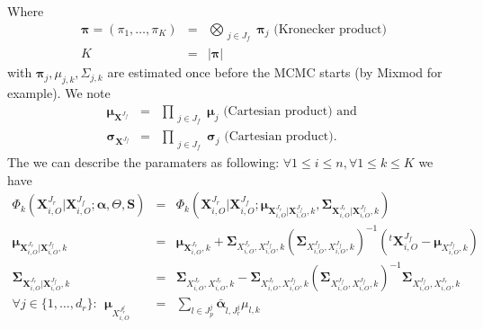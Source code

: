 \documentclass[12pt,a4paper]{report}
\begin{document}
Where	
\begin{eqnarray}
	\boldsymbol{\pi}=(\pi_1,\dots,\pi_K)&=&\bigotimes_{\substack{j \in J_f }} \boldsymbol{\pi}_j \textrm{ (Kronecker product)}\\
	K&=& |\boldsymbol{\pi}|%
\end{eqnarray}
		with $ \boldsymbol{\pi}_j, \mu_{j,k},\Sigma_{j,k}$ are estimated once before the MCMC starts (by Mixmod for example).
		We note 
		\begin{eqnarray}
		\boldsymbol{\mu}_{\boldsymbol{X}^{J_f}}&=&  \prod_{\substack{j \in J_f}}\boldsymbol{\mu}_{j} \textrm{ (Cartesian product) and } \\	
	\boldsymbol{\sigma}_{\boldsymbol{X}^{J_f}}&=&\prod_{\substack{j \in J_f}}\boldsymbol{\sigma}_{j} \textrm{ (Cartesian product). }
		\end{eqnarray}
		The we can describe the paramaters as following:
		$\forall 1\leq i \leq n, \forall 1\leq k \leq K$ we have
\begin{eqnarray}
		\Phi_k(\boldsymbol{X}^{J_r}_{i,O}|\boldsymbol{X}^{J_f}_{i,O};\boldsymbol{\alpha},\Theta,\boldsymbol{S})&=&\Phi_k(\boldsymbol{X}^{J_r}_{i,O}|\boldsymbol{X}^{J_f}_{i,O};\boldsymbol{\mu}_{\boldsymbol{X}^{J_r}_{i,O}|\boldsymbol{X}^{J_f}_{i,O},k},\boldsymbol{\Sigma}_{\boldsymbol{X}^{J_r}_{i,O}|\boldsymbol{X}^{J_f}_{i,O},k})\\
		\boldsymbol{\mu}_{\boldsymbol{X}^{J_r}_{i,O}|\boldsymbol{X}^{J_f}_{i,O},k}&=& 
				\boldsymbol{\mu}_{\boldsymbol{X}^{J_r}_{i,O},k}+
				\boldsymbol{\Sigma}_{X_{i,O}^{J_r},X_{i,O}^{J_f},k}(\boldsymbol{\Sigma}_{X_{i,O}^{J_f},X_{i,O}^{J_f},k})^{-1}
				( ^t\boldsymbol{X}_{i,O}^{J_f}-\boldsymbol{\mu}_{X^{J_f}_{i,O},k}) \ \ \ \\
		\boldsymbol{\Sigma}_{\boldsymbol{X}^{J_r}_{i,O}|\boldsymbol{X}^{J_f}_{i,O},k}&=&\boldsymbol{\Sigma}_{X_{i,O}^{J_r},X_{i,O}^{J_r},k}-\boldsymbol{\Sigma}_{X_{i,O}^{J_r},X_{i,O}^{J_f},k}
		(\boldsymbol{\Sigma}_{X_{i,O}^{J_f},X_{i,O}^{J_f},k})^{-1} \boldsymbol{\Sigma}_{X_{i,O}^{J_f},X_{i,O}^{J_r},k} \\
		\forall j \in \{1,\dots,d_r\}: \ \  \boldsymbol{\mu}_{X_{i,O}^{J_r^j}}&=&\sum_{l \in J_p^j}\bar{\boldsymbol{\alpha}}_{l,J_r^j}\mu_{l,k} 
\end{eqnarray}		
\end{document}
